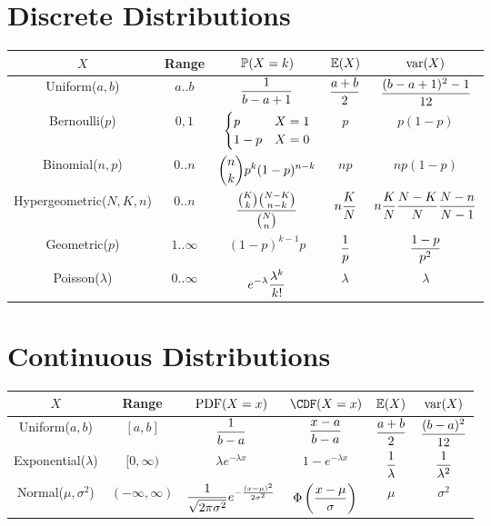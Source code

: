 \documentclass[12pt]{article}
\date{February 2020} %
\begin{document}
\section{Discrete Distributions}

\noindent
\begin{tabular}{c|cccc}
    $X$ & Range & $\mathbb{P}(X=k)$ & $\mathbb{E}(X)$ & $\mathrm{var}(X)$ \\
    \hline
    Uniform($a,b$) & $a..b$ & $\displaystyle\frac1{b-a+1}$ & $\displaystyle\frac{a+b}2$ & $\displaystyle\frac{(b-a+1)^2-1}{12}$ \\
    Bernoulli($p$) & $0,1$ & $\displaystyle\begin{cases}
    p & X=1 \\ 1-p & X=0
    \end{cases}$ & $p$ & $p(1-p)$ \\
    Binomial($n,p$) & $0..n$ & $\displaystyle\binom nk p^k(1-p)^{n-k}$ & $np$ & $np(1-p)$ \\
    Hypergeometric($N,K,n$) & $0..n$ & $\displaystyle\frac{\binom Kk\binom{N-K}{n-k}}{\binom N n}$ & $\displaystyle n\frac KN$ & $\displaystyle n\frac KN\frac{N-K}N\frac{N-n}{N-1}$ \\
    Geometric($p$) & $1..\infty$ & $(1-p)^{k-1}p$ & $\displaystyle\frac1p$ & $\displaystyle\frac{1-p}{p^2}$ \\
    Poisson($\lambda$) & $0..\infty$ & $\displaystyle e^{-\lambda}\frac{\lambda^k}{k!}$ & $\lambda$ & $\lambda$
\end{tabular}

\section{Continuous Distributions}

\noindent
\begin{tabular}{c|ccccc}
    $X$ & Range & $\mathrm{PDF}(X=x)$ & $\CDF(X=x)$ & $\mathbb{E}(X)$ & $\mathrm{var}(X)$ \\
    \hline
    Uniform($a,b$) & $[a,b]$ & $\displaystyle\frac1{b-a}$ & $\displaystyle\frac{x-a}{b-a}$ & $\displaystyle\frac{a+b}2$ & $\displaystyle\frac{(b-a)^2}{12}$ \\
    Exponential($\lambda$) & $[0,\infty)$ & $\lambda e^{-\lambda x}$ & $1-e^{-\lambda x}$ & $\displaystyle\frac1\lambda$ & $\displaystyle\frac1{\lambda^2}$ \\
    Normal($\mu,\sigma^2$) & $(-\infty,\infty)$ & $\displaystyle\frac1{\sqrt{2\pi\sigma^2}}e^{-\frac{(x-\mu)^2}{2\sigma^2}}$ & $\displaystyle\Phi\left(\frac{x-\mu}{\sigma}\right)$ & $\mu$ & $\sigma^2$ \\
\end{tabular}
\end{document}
